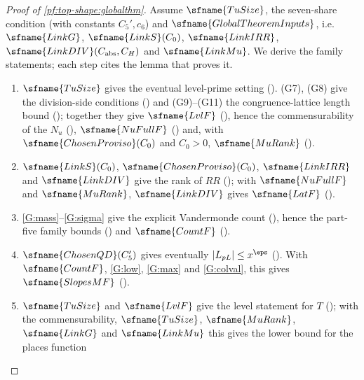 \begin{proof}[Proof of \cref{pf:top-shape:globalthm}]
Assume $\sfname{TuSize}$, the seven-share condition (with constants $C_5',c_6$) and
$\sfname{GlobalTheoremInputs}$, i.e.\ $\sfname{LinkG}$, $\sfname{LinkS}(C_0)$, $\sfname{LinkIRR}$,
$\sfname{LinkDIV}(C_{\rm abs},C_H)$ and $\sfname{LinkMu}$. We derive the family statements; each step cites the lemma
that proves it.
\begin{enumerate}[label=(\arabic*)]
\item $\sfname{TuSize}$ gives the eventual level-prime setting
(). (G7), (G8) give the division-side conditions
() and (G9)--(G11)
the congruence-lattice length bound ();
together they give $\sfname{LvlF}$ (), hence the commensurability of the
$N_u$ (), $\sfname{NuFullF}$
() and, with $\sfname{ChosenProviso}(C_0)$ and $C_0>0$,
$\sfname{MuRank}$ ().
\item $\sfname{LinkS}(C_0)$, $\sfname{ChosenProviso}(C_0)$, $\sfname{LinkIRR}$ and $\sfname{LinkDIV}$ give the rank of
$\mathit{RR}$ (); with $\sfname{NuFullF}$ and $\sfname{MuRank}$,
$\sfname{LinkDIV}$ gives $\sfname{LatF}$ ().
\item \ref{G:mass}--\ref{G:sigma} give the explicit Vandermonde count
(), hence the part-five family bounds
() and $\sfname{CountF}$
().
\item $\sfname{ChosenQD}(C_5')$ gives eventually $|L_{pL}|\le x^{\eps}$ ().
With $\sfname{CountF}$, \ref{G:low}, \ref{G:max} and \ref{G:colval}, this gives $\sfname{SlopesMF}$
().
\item $\sfname{TuSize}$ and $\sfname{LvlF}$ give the level statement for $T$
(); with the commensurability, $\sfname{TuSize}$,
$\sfname{MuRank}$, $\sfname{LinkG}$ and $\sfname{LinkMu}$ this gives the lower bound for the places function

\end{enumerate}
\end{proof}

